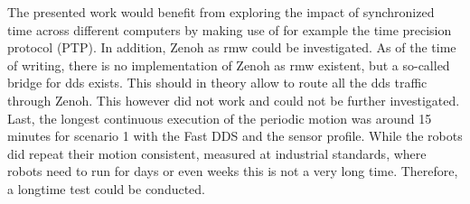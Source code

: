 The presented work would benefit from exploring the impact of synchronized time across different computers by making use of for example the time precision protocol (PTP). In addition, Zenoh as \gls{rmw} could be investigated. As of the time of writing, there is no implementation of Zenoh as \gls{rmw} existent, but a so-called bridge for \gls{dds} exists. This should in theory allow to route all the \gls{dds} traffic through Zenoh. This however did not work and could not be further investigated. Last, the longest continuous execution of the periodic motion was around 15 minutes for scenario 1 with the Fast DDS and the sensor profile. While the robots did repeat their motion consistent, measured at industrial standards, where robots need to run for days or even weeks this is not a very long time. Therefore, a longtime test could be conducted.
